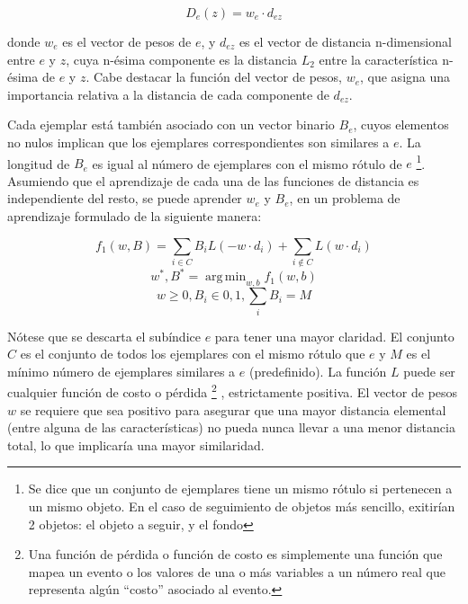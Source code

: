 \documentclass[a4paper,10pt]{article}
\DeclareMathOperator*{\argmin}{arg\,min}
\begin{document}
\begin{equation}
    \label{eq:distance-exemplar}
    D_{e}(z) = w_{e} \cdot d_{ez}
\end{equation}

donde $w_{e}$ es el vector de pesos de $e$, y $d_{ez}$ es el vector de distancia 
n-dimensional entre $e$ y $z$, cuya n-ésima componente es la distancia $L_{2}$ 
entre la característica n-ésima de $e$ y $z$. Cabe destacar la función del vector de pesos, $w_{e}$, 
que asigna una importancia relativa a la distancia de cada componente de $d_{ez}$.

Cada ejemplar está también asociado con un vector binario $B_{e}$, cuyos elementos 
no nulos implican que los ejemplares correspondientes son similares a $e$. La 
longitud de $B_{e}$ es igual al número de ejemplares con el mismo rótulo de $e$
\footnote{Se dice que un conjunto de ejemplares tiene un mismo rótulo si pertenecen a un mismo objeto. En el caso de seguimiento de objetos
más sencillo, exitirían 2 objetos: el objeto a seguir, y el fondo}.
Asumiendo que el aprendizaje de cada una de las funciones de distancia es 
independiente del resto, se puede aprender $w_{e}$ y $B_{e}$, en un problema 
de aprendizaje formulado de la siguiente manera:

\begin{equation}
    \label{eq:learning-problem}
    f_{1}(w,B) = \sum_{i \in C} B_{i}L(-w \cdot d_{i}) + \sum_{i\notin C}L(w \cdot d_{i})
\end{equation}
\begin{equation}
    {w^{*}, B^{*} = \argmin_{w,b} f_{1} (w,b) }
\end{equation}
\begin{equation}
   w \geq 0, B_{i} \in {0,1}, \sum_{i} B_{i} = M
\end{equation}

Nótese que se descarta el subíndice $e$ para tener una mayor claridad.
El conjunto $C$ es el conjunto de todos los ejemplares con el mismo rótulo que $e$ y $M$ 
es el mínimo número de ejemplares similares a $e$ (predefinido). La función $L$ puede ser
cualquier función de costo o pérdida
\footnote{Una función de pérdida o función de costo es simplemente una función que mapea un evento o los valores de una o más variables
a un número real que representa algún ``costo'' asociado al evento.}
, estrictamente positiva.
El vector de pesos $w$
se requiere que sea positivo para asegurar que una mayor distancia elemental (entre 
alguna de las características) no pueda nunca llevar a una menor distancia total, 
lo que implicaría una mayor similaridad.
\end{document}
